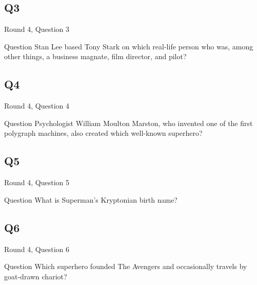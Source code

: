 \documentclass[11pt]{beamer}
\begin{document}
\subsection*{Q3}
\begin{frame}[t]{Round 4, Question 3}
\begin{block}{Question}
Stan Lee based Tony Stark on which real-life person who was, among other things, a business magnate, film director, and pilot?
\end{block}
\end{frame}
\subsection*{Q4}
\begin{frame}[t]{Round 4, Question 4}
\begin{block}{Question}
Psychologist William Moulton Marston, who invented one of the first polygraph machines, also created which well-known superhero?
\end{block}
\end{frame}
\subsection*{Q5}
\begin{frame}[t]{Round 4, Question 5}
\begin{block}{Question}
What is Superman's Kryptonian birth name?
\end{block}
\end{frame}
\subsection*{Q6}
\begin{frame}[t]{Round 4, Question 6}
\begin{block}{Question}
Which superhero founded The Avengers and occasionally travels by goat-drawn chariot?
\end{block}
\end{frame}
\end{document}
